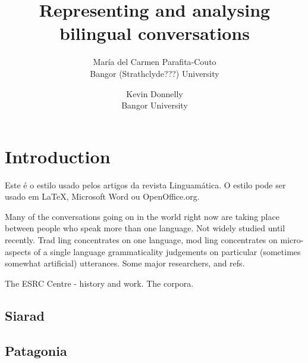 \documentclass[a4paper, twocolumn, 11pt, twoside]{article}
\title{\textbf{Representing and analysing bilingual conversations}}
\author{
  María del Carmen Parafita-Couto\\
  Bangor (Strathclyde???) University\\
  \email{maricarme@gmail.com} 
  \and 
  Kevin Donnelly\\
  Bangor University\\
  \email{kevin@dotmon.com}
}
\date{}
\begin{document}
\thispagestyle{empty}


\section{Introduction}

Este é o estilo usado pelos artigos da revista Linguamática. O estilo pode ser usado em \LaTeX \cite{latexcompanion}, Microsoft Word ou OpenOffice.org.

Many of the conversations going on in the world right now are taking place between people who speak more than one language.  Not widely studied until recently.  Trad ling concentrates on one language, mod ling concentrates on micro-aspects of a single language grammaticality judgements on particular (sometimes somewhat artificial) utterances.  Some major researchers, and refs.

The ESRC Centre - history and work.  The corpora.

\subsection{Siarad}

\subsection{Patagonia}
\end{document}
